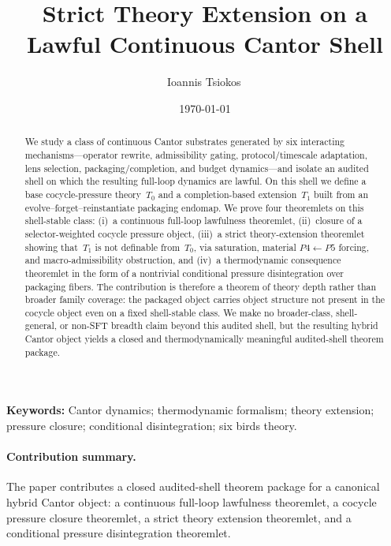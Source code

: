 \documentclass[11pt]{article}
\theoremstyle{definition}
\begin{document}
\title{Strict Theory Extension on a\\Lawful Continuous Cantor Shell}
\author{Ioannis Tsiokos\,}
\date{\today}

\maketitle
\thispagestyle{firstpage}

\begin{abstract}
We study a class of continuous Cantor substrates generated by six interacting mechanisms---operator rewrite, admissibility gating, protocol/timescale adaptation, lens selection, packaging/completion, and budget dynamics---and isolate an audited shell on which the resulting full-loop dynamics are lawful. On this shell we define a base cocycle-pressure theory~$T_0$ and a completion-based extension~$T_1$ built from an evolve--forget--reinstantiate packaging endomap. We prove four theoremlets on this shell-stable class: (i)~a continuous full-loop lawfulness theoremlet, (ii)~closure of a selector-weighted cocycle pressure object, (iii)~a strict theory-extension theoremlet showing that~$T_1$ is not definable from~$T_0$, via saturation, material $P4 \leftarrow P5$ forcing, and macro-admissibility obstruction, and (iv)~a thermodynamic consequence theoremlet in the form of a nontrivial conditional pressure disintegration over packaging fibers. The contribution is therefore a theorem of theory depth rather than broader family coverage: the packaged object carries object structure not present in the cocycle object even on a fixed shell-stable class. We make no broader-class, shell-general, or non-SFT breadth claim beyond this audited shell, but the resulting hybrid Cantor object yields a closed and thermodynamically meaningful audited-shell theorem package.
\end{abstract}

\smallskip

\noindent\textbf{Keywords:} Cantor dynamics; thermodynamic formalism; theory extension; pressure closure; conditional disintegration; six birds theory.

\medskip

\paragraph{Contribution summary.}
The paper contributes a closed audited-shell theorem package for a canonical hybrid Cantor object: a continuous full-loop lawfulness theoremlet, a cocycle pressure closure theoremlet, a strict theory extension theoremlet, and a conditional pressure disintegration theoremlet.
\end{document}
